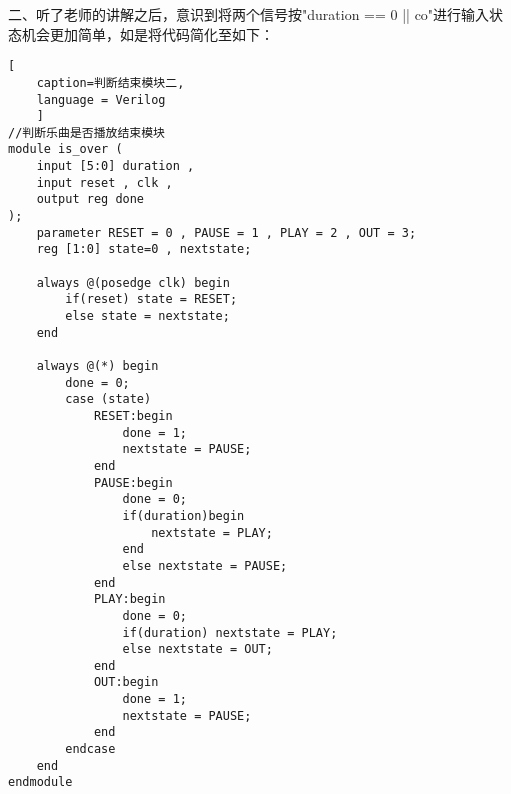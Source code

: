 \documentclass{../source/zjureport}
\begin{document}
            二、听了老师的讲解之后，意识到将两个信号按"duration == 0 || co"进行输入状态机会更加简单，如是将代码简化至如下：
\begin{lstlisting}[
    caption=判断结束模块二,
    language = Verilog
    ]
//判断乐曲是否播放结束模块
module is_over (
    input [5:0] duration ,
    input reset , clk ,
    output reg done
);
    parameter RESET = 0 , PAUSE = 1 , PLAY = 2 , OUT = 3;
    reg [1:0] state=0 , nextstate;

    always @(posedge clk) begin
        if(reset) state = RESET;
        else state = nextstate;
    end

    always @(*) begin
        done = 0;
        case (state)
            RESET:begin
                done = 1;
                nextstate = PAUSE;
            end 
            PAUSE:begin
                done = 0;
                if(duration)begin
                    nextstate = PLAY;
                end
                else nextstate = PAUSE;
            end
            PLAY:begin
                done = 0;
                if(duration) nextstate = PLAY;
                else nextstate = OUT;
            end
            OUT:begin
                done = 1;
                nextstate = PAUSE;
            end
        endcase
    end
endmodule
\end{lstlisting}
\end{document}
